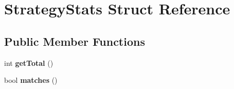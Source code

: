 \hypertarget{struct_strategy_stats}{\section{Strategy\-Stats Struct Reference}
\label{struct_strategy_stats}
}
\subsection*{Public Member Functions}
\begin{DoxyCompactItemize}
\item 
\hypertarget{struct_strategy_stats_a5df69311e3c8efefd1db5f5f1a463d45}{int {\bfseries get\-Total} ()}\label{struct_strategy_stats_a5df69311e3c8efefd1db5f5f1a463d45}

\item 
\hypertarget{struct_strategy_stats_a8eca8fcfd4abd0a47b9af96d91104a5f}{bool {\bfseries matches} ()}\label{struct_strategy_stats_a8eca8fcfd4abd0a47b9af96d91104a5f}

\end{DoxyCompactItemize}
